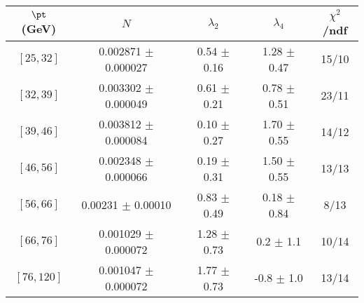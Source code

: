 \begin{tabular}{c||c|c|c|c}
$\pt$ (GeV) & $N$ & $\lambda_{2}$ & $\lambda_4$  & $\chi^2$/ndf  \\
\hline
$[25, 32]$ & 0.002871 $\pm$ 0.000027 & 0.54 $\pm$ 0.16 & 1.28 $\pm$ 0.47 & 15/10\\
$[32, 39]$ & 0.003302 $\pm$ 0.000049 & 0.61 $\pm$ 0.21 & 0.78 $\pm$ 0.51 & 23/11\\
$[39, 46]$ & 0.003812 $\pm$ 0.000084 & 0.10 $\pm$ 0.27 & 1.70 $\pm$ 0.55 & 14/12\\
$[46, 56]$ & 0.002348 $\pm$ 0.000066 & 0.19 $\pm$ 0.31 & 1.50 $\pm$ 0.55 & 13/13\\
$[56, 66]$ & 0.00231 $\pm$ 0.00010 & 0.83 $\pm$ 0.49 & 0.18 $\pm$ 0.84 & 8/13\\
$[66, 76]$ & 0.001029 $\pm$ 0.000072 & 1.28 $\pm$ 0.73 & 0.2 $\pm$ 1.1 & 10/14\\
$[76, 120]$ & 0.001047 $\pm$ 0.000072 & 1.77 $\pm$ 0.73 & -0.8 $\pm$ 1.0 & 13/14\\
\end{tabular}
